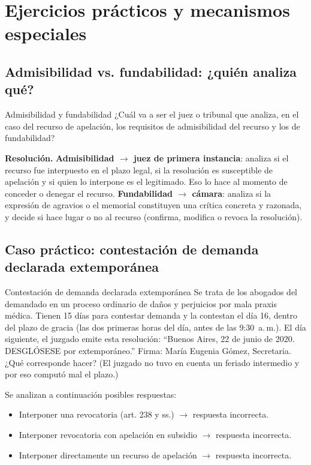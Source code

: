 \documentclass[12pt,oneside]{book}
\begin{document}
\chapter{Ejercicios prácticos y mecanismos especiales}

\section{Admisibilidad vs. fundabilidad: ¿quién analiza qué?}

\begin{exercise}{Admisibilidad y fundabilidad}
¿Cuál va a ser el juez o tribunal que analiza, en el caso del recurso de apelación, los requisitos de admisibilidad del recurso y los de fundabilidad?
\end{exercise}

\textbf{Resolución.} \textbf{Admisibilidad $\rightarrow$ juez de primera instancia}: analiza si el recurso fue interpuesto en el plazo legal, si la resolución es susceptible de apelación y si quien lo interpone es el legitimado. Eso lo hace al momento de conceder o denegar el recurso. \textbf{Fundabilidad $\rightarrow$ cámara}: analiza si la expresión de agravios o el memorial constituyen una crítica concreta y razonada, y decide si hace lugar o no al recurso (confirma, modifica o revoca la resolución).

\section{Caso práctico: contestación de demanda declarada extemporánea}

\begin{exercise}{Contestación de demanda declarada extemporánea}
Se trata de los abogados del demandado en un proceso ordinario de daños y perjuicios por mala praxis médica. Tienen 15 días para contestar demanda y la contestan el día 16, dentro del plazo de gracia (las dos primeras horas del día, antes de las 9:30~a.\,m.). El día siguiente, el juzgado emite esta resolución: ``Buenos Aires, 22 de junio de 2020. DESGLÓSESE por extemporáneo.'' Firma: María Eugenia Gómez, Secretaria. ¿Qué corresponde hacer? (El juzgado no tuvo en cuenta un feriado intermedio y por eso computó mal el plazo.)
\end{exercise}

Se analizan a continuación posibles respuestas:

\begin{itemize}
\item Interponer una revocatoria (art. 238 y ss.) $\rightarrow$ respuesta incorrecta.
\item Interponer revocatoria con apelación en subsidio $\rightarrow$ respuesta incorrecta.
\item Interponer directamente un recurso de apelación $\rightarrow$ respuesta incorrecta.
\end{itemize}
\end{document}
